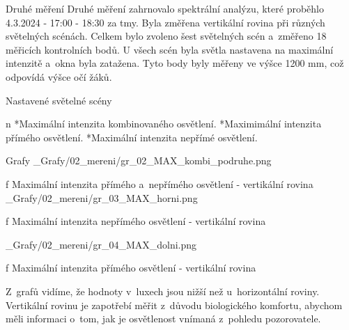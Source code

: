 \sec Druhé měření
Druhé měření zahrnovalo spektrální analýzu, které proběhlo 4.3.2024 - 17:00 - 18:30 za tmy. Byla změřena vertikální rovina při různých světelných scénách.
Celkem bylo zvoleno šest světelných scén a~změřeno 18 měřicích kontrolních bodů. U všech scén byla světla nastavena na maximální intenzitě a~okna byla zatažena.
Tyto body byly měřeny ve výšce 1200 mm, což odpovídá výšce očí žáků.
\medskip

{\sbf Nastavené světelné scény}

\begitems \style n
    *Maximální intenzita kombinovaného osvětlení.
    *Maximimální intenzita přímého osvětlení.
    *Maximální intenzita nepřímé osvětlení.
\enditems

\secc Grafy
\medskip {}
\picw=15cm _Grafy/02_mereni/gr_02_MAX_kombi_podruhe.png
\caption/f Maximální intenzita přímého a~nepřímého osvětlení - vertikální rovina
\medskip {}
\picw=15cm _Grafy/02_mereni/gr_03_MAX_horni.png
\caption/f Maximální intenzita nepřímého osvětlení - vertikální rovina

\medskip {}
\picw=15cm _Grafy/02_mereni/gr_04_MAX_dolni.png
\caption/f Maximální intenzita přímého osvětlení - vertikální rovina
\medskip

Z~grafů vidíme, že hodnoty v~luxech jsou nižší než u~horizontální roviny. 
Vertikální rovinu je zapotřebí měřit z~důvodu biologického komfortu, abychom měli informaci o~tom,
jak je osvětlenost vnímaná z~pohledu pozorovatele.
\medskip



